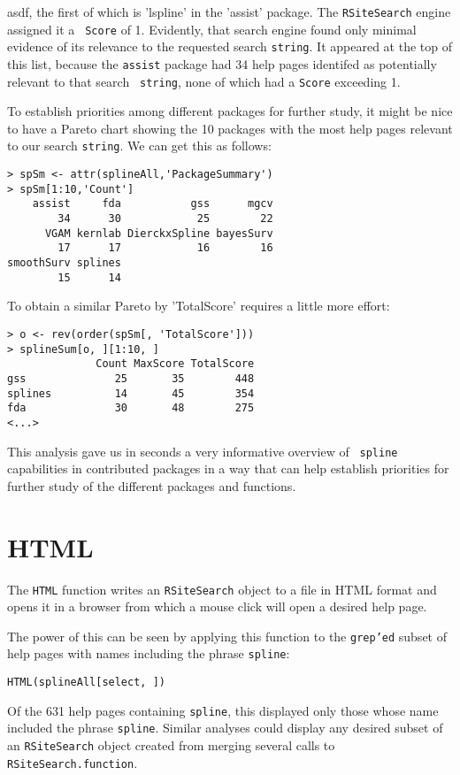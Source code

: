 asdf, 
the first of which is 'lspline' in the
'assist' package.  The {\tt RSiteSearch} engine assigned it a {\tt
Score} of 1.  Evidently, that search engine found only minimal
evidence of its relevance to the requested search {\tt string}.  It
appeared at the top of this list, because the {\tt assist} package had
34 help pages identifed as potentially relevant to that search {\tt
string}, none of which had a {\tt Score} exceeding 1.  

To establish priorities among different packages for further study, it
might be nice to have a Pareto chart showing the 10 packages with the 
most help pages relevant to our search {\tt string}.  We can get this as
follows:
\begin{verbatim}
> spSm <- attr(splineAll,'PackageSummary')
> spSm[1:10,'Count']
    assist     fda           gss      mgcv
        34      30            25        22
      VGAM kernlab DierckxSpline bayesSurv
        17      17            16        16
smoothSurv splines
        15      14
\end{verbatim}
To obtain a similar Pareto by 'TotalScore' requires a little more
effort:
\begin{verbatim}
> o <- rev(order(spSm[, 'TotalScore']))
> splineSum[o, ][1:10, ]
              Count MaxScore TotalScore
gss              25       35        448
splines          14       45        354
fda              30       48        275
<...>
\end{verbatim}
This analysis gave us in seconds a very informative overview of {\tt
spline} capabilities in contributed \R{} packages in a way that can help
establish priorities for further study of the different packages and
functions.

\section*{HTML}
The {\tt HTML} function writes an {\tt RSiteSearch} object to a file
in HTML format and opens it in a browser from which a mouse click will
open a desired help page.

The power of this can be seen by applying this function to the
{\tt grep'ed} subset of help pages with names including the phrase
{\tt spline}:

\begin{verbatim}
HTML(splineAll[select, ])
\end{verbatim}

Of the 631 help pages containing {\tt spline}, this displayed only
those whose name included the phrase {\tt spline}.  Similar analyses
could display any desired subset of an {\tt RSiteSearch} object
created from merging several calls to {\tt RSiteSearch.function}.

